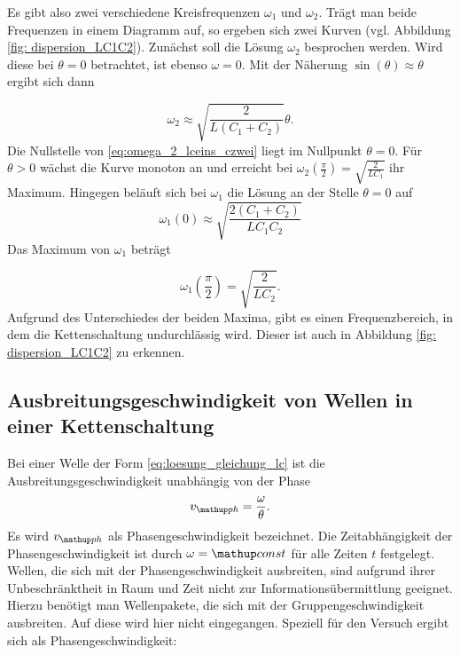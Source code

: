 Es gibt also zwei verschiedene Kreisfrequenzen $\omega_1$ und $\omega_2$.
Trägt man beide Frequenzen in einem Diagramm auf, so ergeben sich %
zwei Kurven (vgl. Abbildung \ref{fig: dispersion_LC1C2}).
Zunächst soll die Lösung $\omega_2$ besprochen werden.
Wird diese bei $\theta=0$ betrachtet, ist ebenso $\omega=0$.
Mit der Näherung $\sin(\theta)\approx\theta$ ergibt sich dann

\begin{equation}
\label{eq:omega_2_lceins_czwei}
\omega_2\approx\sqrt{\frac{2}{L\left(C_1+C_2\right)}}\theta.
\end{equation}
Die Nullstelle von \eqref{eq:omega_2_lceins_czwei} liegt im Nullpunkt $\theta=0$.
Für $\theta>0$ wächst die Kurve monoton an und erreicht bei $\omega_2(\frac{\pi}{2})=\sqrt{\frac{2}{LC_1}}$
ihr Maximum. \newline
Hingegen beläuft sich bei $\omega_1$ die Lösung an der Stelle $\theta=0$ auf
\begin{equation*}
\omega_1(0)\approx\sqrt{\frac{2(C_1+C_2)}{LC_1C_2}}
\end{equation*}
Das Maximum von $\omega_1$ beträgt

\begin{equation}
\label{eq:max_omega_1_ceins_czwei}
\omega_1(\frac{\pi}{2})=\sqrt{\frac{2}{LC_2}}.
\end{equation}
Aufgrund des Unterschiedes der beiden Maxima, gibt es einen Frequenzbereich, in dem %
die Kettenschaltung undurchlässig wird. Dieser ist auch in Abbildung \ref{fig: dispersion_LC1C2} %
zu erkennen.

\subsection{Ausbreitungsgeschwindigkeit von Wellen in einer Kettenschaltung}
Bei einer Welle der Form \eqref{eq:loesung_gleichung_lc} %
ist die Ausbreitungsgeschwindigkeit unabhängig von der Phase %
\begin{equation*}
v\ua{ph}=\frac{\omega}{\theta}.
\end{equation*}
Es wird $v\ua{ph}$ als Phasengeschwindigkeit bezeichnet.
Die Zeitabhängigkeit der Phasengeschwindigkeit ist durch $\omega=\map{const}$
für alle Zeiten $t$ festgelegt. Wellen, die sich mit der Phasengeschwindigkeit
ausbreiten, sind aufgrund ihrer Unbeschränktheit in Raum und Zeit nicht zur %
Informationsübermittlung geeignet. Hierzu benötigt man Wellenpakete, die sich
mit der Gruppengeschwindigkeit ausbreiten. Auf diese wird hier nicht eingegangen. %
Speziell für den Versuch ergibt sich als Phasengeschwindigkeit:

